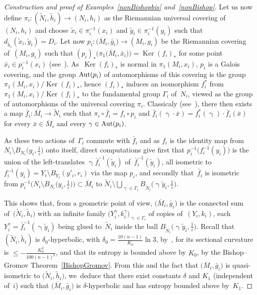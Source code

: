 \documentclass[pdftex]{sigma}
\numberwithin{equation}{section}
\newcommand{\f}{\rightarrow}
\newcommand{\Ker}{\operatorname{Ker}}
\newcommand{\g}{\operatorname{\gamma}}
\begin{document}
\begin{proof}[Construction and proof of Examples~\ref{nonBishopbis} and~\ref{nonBishop}]
Let us now define $\pi_i \colon (\widetilde N_i, \tilde h_i) \f (N_i, h_i)$ as
the Riemannian universal covering of~$(N_i, h_i)$ and choose $\tilde x_i \in \pi_i^{-1} (x_i)$
and $\tilde y_i \in \pi_i^{-1} (y_i)$ such that $d_{\tilde h_i} (\tilde x_i, \tilde y_i) = D_i $. Let now $ p_i \colon \big(\overline M_i, \bar g_i\big) \f
(M_i, g_i)$ be the Riemannian
covering of~$(M_i, g_i)$ such that $(p_i)_* \big(\pi_1 \big(\overline M_i, \bar x_i\big) \big) = \Ker (f_i)_* $ for some point $\bar x_i \in p_i^{-1} (x_i)$ (see~\cite[Corollary~6.9]{GrH}). As~$\Ker (f_i)_*$ is normal in $\pi_1 (M_i, x_i)$, $p_i$ is a Galois covering, and the group ${\rm Aut} (p_i)$ of automorphisms of this covering is the
group $\pi_1 (M_i, x_i) / \Ker (f_i)_* $, hence $(f_i)_* $ induces an isomorphism $f_i^*$ from $\pi_1 (M_i, x_i) / \Ker (f_i)_*$ to the fundamental
group $\Gamma_i$ of~$N_i$, viewed as the group of automorphisms of the universal covering $\pi_i$.
Classicaly (see~\cite[Theorem~(6.1)]{GrH}), there then exists a map $\bar
f_i \colon \overline M_i \f \widetilde N_i$ such that $\pi_i \circ \bar f_i =
f_i \circ p_i$
and $ \bar f_i (\g\cdot \bar x) = f_i^* (\g) \cdot \bar f_i (\bar x)$ for every $\bar x \in \overline M_i $ and every $\g \in {\rm Aut} (p_i)$.

As these two actions of~$\Gamma_i$ commute with $\bar f_i $ and as $f_i$ is the identity map from $ N_i \setminus B_{N_i} \big(y_i, \frac{1}{i}\big)$ onto itself,
direct computations give first that $p_i^{-1} \big( f_i^{-1} (y_i)\big)$ is the union of the left-translates $ \g \bar f_i^{-1} ( \tilde y_i) $ of~$\bar f_i^{-1} ( \tilde y_i) $, all isometric to $ f_i^{-1} (y_i) = Y_i
\setminus B_{Y_i} (y'_i, r_i) $ via the map $p_i$, and secondly that~$\bar f_i$ is isometric from $p_i^{-1} \big( N_i \setminus B_{N_i} \big(y_i, \frac{1}{i}\big)\big) \subset \overline M_i$ to $\widetilde N_i \setminus \bigcup_{\g \in \Gamma_i} B_{\widetilde N_i} \big(\g \tilde y_i, \frac{1}{i}\big)$.

This shows that, from a geometric point of view, $\big(\overline M_i, \bar g_i\big)$ is the connected sum of~$\big(\widetilde N_i, \tilde h_i\big)$ with an infinite
family $\big(Y_i^\gamma, k_i^\gamma\big)_{\g \in \Gamma_i}$ of copies of~$(Y_i, k_i)$, each $Y_i^\gamma = \bar f_i^{-1} (\g \tilde y_i) $ being glued
to~$\widetilde N_i$ inside
the ball $B_{\widetilde N_i} \big(\g \tilde y_i, \frac{1}{i} \big)$.
Recall that $(\widetilde N_i, \tilde h_i)$ is $\delta_0$-hyperbolic, with
$\delta_0 = \frac{10 (n-1)}{K_0} \ln 3 $, by~\cite[Proposition~1.4.3, p.~12]{CDP},
for its sectional curvature is $\le - \frac{K_0^2}{100 (n-1)^2}$, and that its entropy is bounded above by $K_0$, by the Bishop--Gromov Theorem~\ref{BishopGromov}. From this and the fact that $\big(\overline M_i, \bar g_i\big)$
 is quasi-isometric to $\big(\widetilde N_i, \tilde h_i\big)$, we~deduce that
there exist constants $\delta$ and $K_1$ (independent of~$i$) such that $\big(\overline M_i, \bar g_i\big)$ is $\delta$-hyperbolic and has entropy bounded
above by~$K_1$.


\end{proof}
\end{document}
